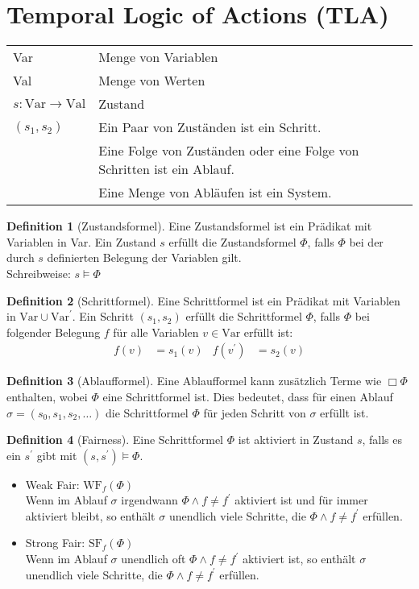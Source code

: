 \documentclass{scrreprt}
\theoremstyle{definition}
\newtheorem{Definition}{Definition}[section]
\theoremstyle{example}
\theoremstyle{algorithm}
\begin{document}
\section{Temporal Logic of Actions (TLA)}
\begin{tabularx}{\linewidth}{lX}
Var&Menge von Variablen\\
Val&Menge von Werten\\
$s: \text{Var}\rightarrow\text{Val}$&Zustand\\
$(s_1,s_2)$&Ein Paar von Zuständen ist ein Schritt.\\
&Eine Folge von Zuständen oder eine Folge von Schritten ist ein Ablauf.\\
&Eine Menge von Abläufen ist ein System.\\
\end{tabularx}

\begin{Definition}[Zustandsformel]
Eine Zustandsformel ist ein Prädikat mit Variablen in Var. Ein Zustand $s$ erfüllt die Zustandsformel $\Phi$, falls $\Phi$ bei der durch $s$ definierten Belegung der Variablen gilt.\\
Schreibweise: $s \models \Phi$
\end{Definition}

\begin{Definition}[Schrittformel]
Eine Schrittformel ist ein Prädikat mit Variablen in $\text{Var} \cup \text{Var}^\prime$. Ein Schritt $(s_1,s_2)$ erfüllt die Schrittformel $\Phi$, falls $\Phi$ bei folgender Belegung $f$ für alle Variablen $v\in\text{Var}$ erfüllt ist:
\begin{align*}
f(v)&=s_1(v)&f(v^\prime)&=s_2(v)
\end{align*}
\end{Definition}

\begin{Definition}[Ablaufformel]
Eine Ablaufformel kann zusätzlich Terme wie $\Box\Phi$ enthalten, wobei $\Phi$ eine Schrittformel ist. Dies bedeutet, dass für einen Ablauf ${\sigma = (s_0,s_1,s_2,\ldots)}$ die Schrittformel $\Phi$ für jeden Schritt von $\sigma$ erfüllt ist.
\end{Definition}

\begin{Definition}[Fairness]
Eine Schrittformel $\Phi$ ist aktiviert in Zustand $s$, falls es ein $s^\prime$ gibt mit $(s,s^\prime)\models \Phi$.
\begin{itemize}
\item
Weak Fair: $\text{WF}_f(\Phi)$\\
Wenn im Ablauf $\sigma$ irgendwann $\Phi\land f \not = f^\prime$ aktiviert ist und für immer aktiviert bleibt, so enthält $\sigma$ unendlich viele Schritte, die $\Phi \land f \not = f^\prime$ erfüllen.
\item
Strong Fair: $\text{SF}_f(\Phi)$\\
Wenn im Ablauf $\sigma$ unendlich oft $\Phi\land f \not = f^\prime$ aktiviert ist, so enthält $\sigma$ unendlich viele Schritte, die $\Phi \land f \not = f^\prime$ erfüllen.
\end{itemize}
\end{Definition}
\end{document}
